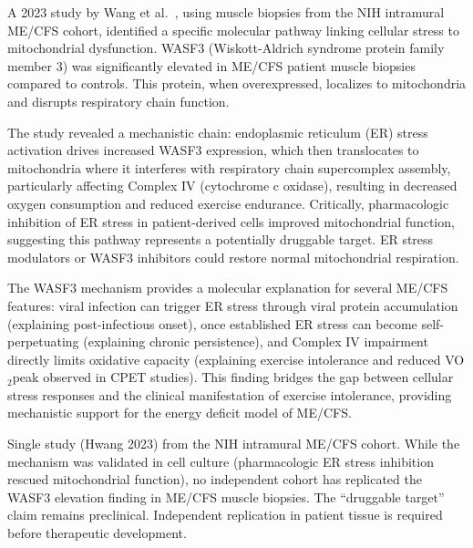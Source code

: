 \begin{achievement}
\label{ach:wasf3-mechanism}
A 2023 study by Wang et al.~\cite{wang2023wasf3}, using muscle biopsies from the NIH intramural ME/CFS cohort, identified a specific molecular pathway linking cellular stress to mitochondrial dysfunction. WASF3 (Wiskott-Aldrich syndrome protein family member 3) was significantly elevated in ME/CFS patient muscle biopsies compared to controls. This protein, when overexpressed, localizes to mitochondria and disrupts respiratory chain function.

The study revealed a mechanistic chain: endoplasmic reticulum (ER) stress activation drives increased WASF3 expression, which then translocates to mitochondria where it interferes with respiratory chain supercomplex assembly, particularly affecting Complex IV (cytochrome c oxidase), resulting in decreased oxygen consumption and reduced exercise endurance. Critically, pharmacologic inhibition of ER stress in patient-derived cells improved mitochondrial function, suggesting this pathway represents a potentially druggable target. ER stress modulators or WASF3 inhibitors could restore normal mitochondrial respiration.

The WASF3 mechanism provides a molecular explanation for several ME/CFS features: viral infection can trigger ER stress through viral protein accumulation (explaining post-infectious onset), once established ER stress can become self-perpetuating (explaining chronic persistence), and Complex IV impairment directly limits oxidative capacity (explaining exercise intolerance and reduced VO$_2$peak observed in CPET studies). This finding bridges the gap between cellular stress responses and the clinical manifestation of exercise intolerance, providing mechanistic support for the energy deficit model of ME/CFS.
\end{achievement}

\begin{warning}
Single study (Hwang 2023) from the NIH intramural ME/CFS cohort. While the mechanism was validated in cell culture (pharmacologic ER stress inhibition rescued mitochondrial function), no independent cohort has replicated the WASF3 elevation finding in ME/CFS muscle biopsies. The ``druggable target'' claim remains preclinical. Independent replication in patient tissue is required before therapeutic development.
\end{warning}

